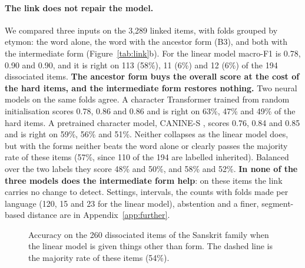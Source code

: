 \documentclass[11pt]{article}
\begin{document}
\paragraph{The link does not repair the model.} We compared three inputs on the 3,289 linked items, with folds grouped by etymon: the word alone, the word with the ancestor form (B3), and both with the intermediate form (Figure~\ref{tab:link}b). For the linear model macro-F1 is 0.78, 0.90 and 0.90, and it is right on 113 (58\%), 11 (6\%) and 12 (6\%) of the 194 dissociated items. \textbf{The ancestor form buys the overall score at the cost of the hard items, and the intermediate form restores nothing.} Two neural models on the same folds agree. A character Transformer trained from random initialisation scores 0.78, 0.86 and 0.86 and is right on 63\%, 47\% and 49\% of the hard items. A pretrained character model, CANINE-S \citep{clark2022canine}, scores 0.76, 0.84 and 0.85 and is right on 59\%, 56\% and 51\%. Neither collapses as the linear model does, but with the forms neither beats the word alone or clearly passes the majority rate of these items (57\%, since 110 of the 194 are labelled inherited). Balanced over the two labels they score 48\% and 50\%, and 58\% and 52\%. \textbf{In none of the three models does the intermediate form help}: on these items the link carries no change to detect. Settings, intervals, the counts with folds made per language (120, 15 and 23 for the linear model), abstention and a finer, segment-based distance are in Appendix~\ref{app:further}.

\begin{figure}[t]
\centering
{}
\caption{Accuracy on the 260 dissociated items of the Sanskrit family when the linear model is given things other than form. The dashed line is the majority rate of these items (54\%).}
\label{fig:helps}
\end{figure}
\end{document}
